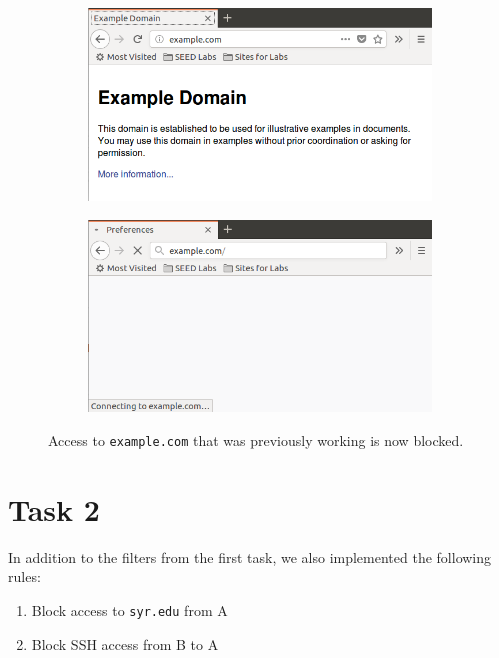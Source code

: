 \documentclass[12pt,letterpaper]{article}
\begin{document}
		\begin{figure}[p]
			\centering
			\begin{subfigure}{.5\linewidth}
				\centering
				\includegraphics[width=.95\linewidth]{task-1-example-com-working}
			\end{subfigure}%
			\begin{subfigure}{.5\linewidth}
				\centering
				\includegraphics[width=.95\linewidth]{task-1-example-com-blocked}
			\end{subfigure}
			\caption{Access to \texttt{example.com} that was previously working is now blocked.}
			\label{fig:task-1-example-com}
		\end{figure}
	
	\section*{Task 2}
		In addition to the filters from the first task, we also implemented the following rules:
		
		\begin{enumerate}
			\item Block access to \texttt{syr.edu} from A
			\item Block SSH access from B to A
		\end{enumerate}
	
\end{document}
